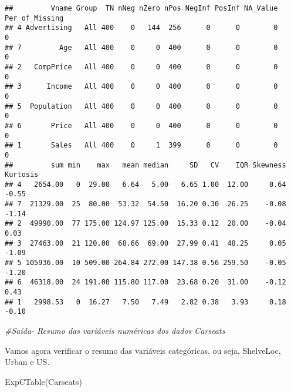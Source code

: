 \documentclass[
]{article}
\newenvironment{Shaded}{\begin{snugshade}}{\end{snugshade}}
\newcommand{\CommentTok}[1]{\textcolor[rgb]{0.56,0.35,0.01}{\textit{#1}}}
\newcommand{\FunctionTok}[1]{\textcolor[rgb]{0.00,0.00,0.00}{#1}}
\newcommand{\NormalTok}[1]{#1}
\begin{document}
\begin{verbatim}
##         Vname Group  TN nNeg nZero nPos NegInf PosInf NA_Value Per_of_Missing
## 4 Advertising   All 400    0   144  256      0      0        0              0
## 7         Age   All 400    0     0  400      0      0        0              0
## 2   CompPrice   All 400    0     0  400      0      0        0              0
## 3      Income   All 400    0     0  400      0      0        0              0
## 5  Population   All 400    0     0  400      0      0        0              0
## 6       Price   All 400    0     0  400      0      0        0              0
## 1       Sales   All 400    0     1  399      0      0        0              0
##         sum min    max   mean median     SD   CV    IQR Skewness Kurtosis
## 4   2654.00   0  29.00   6.64   5.00   6.65 1.00  12.00     0.64    -0.55
## 7  21329.00  25  80.00  53.32  54.50  16.20 0.30  26.25    -0.08    -1.14
## 2  49990.00  77 175.00 124.97 125.00  15.33 0.12  20.00    -0.04     0.03
## 3  27463.00  21 120.00  68.66  69.00  27.99 0.41  48.25     0.05    -1.09
## 5 105936.00  10 509.00 264.84 272.00 147.38 0.56 259.50    -0.05    -1.20
## 6  46318.00  24 191.00 115.80 117.00  23.68 0.20  31.00    -0.12     0.43
## 1   2998.53   0  16.27   7.50   7.49   2.82 0.38   3.93     0.18    -0.10
\end{verbatim}

\begin{Shaded}
\begin{Highlighting}[]
\CommentTok{\#Saída{-} Resumo das variáveis numéricas dos dados Carseats}
\end{Highlighting}
\end{Shaded}

Vamos agora verificar o resumo das variáveis categóricas, ou seja,
ShelveLoc, Urban e US.

\begin{Shaded}
\begin{Highlighting}[]
\FunctionTok{ExpCTable}\NormalTok{(Carseats)}
\end{Highlighting}
\end{Shaded}
\end{document}

